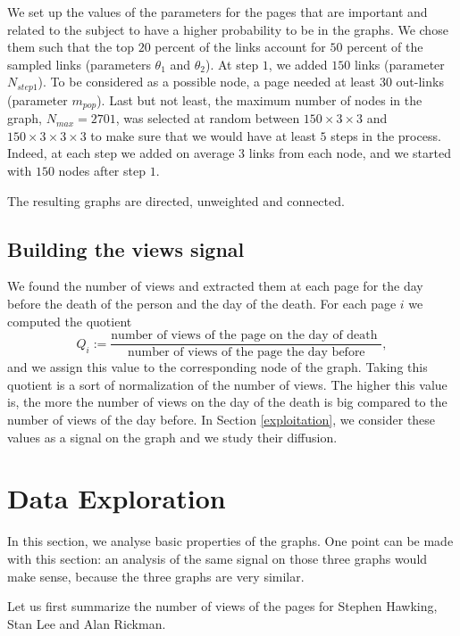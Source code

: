 \documentclass[conference]{IEEEtran}
\begin{document}
We set up the values of the parameters for the pages that are important and related to the subject to have a higher probability to be in the graphs. We chose them such that the top $20$ percent of the links account for $50$ percent of the sampled links (parameters $\theta_1$ and $\theta_2$). At step $1$, we added $150$ links (parameter $N_{step1}$). To be considered as a possible node, a page needed at least $30$ out-links (parameter $m_{pop}$). Last but not least, the maximum number of nodes in the graph, $N_{max}=2701$, was selected at random between $150 \times 3 \times 3$ and $150 \times 3 \times 3 \times 3$ to make sure that we would have at least $5$ steps in the process. Indeed, at each step we added on average $3$ links from each node, and we started with $150$ nodes after step $1$.


\medskip

The resulting graphs are directed, unweighted and connected. 

\subsection{Building the views signal}
We found the number of views and extracted them at each page for the day before the death of the person and the day of the death. 
For each page $i$  we computed the quotient  \[Q_i:=\frac{\text{number of views of the page on the day of death }}{\text{number of views of the page the day before}},\] and we assign this value to the corresponding node of the graph. Taking this quotient is a sort of normalization of the number of views. The higher this value is, the more the number of views on the day of the death is big compared to the number of views of the day before.  In Section \ref{exploitation}, we consider these values as a signal on the graph and we study their diffusion. 

\section{Data Exploration} \label{exploration}

In this section, we analyse basic properties of the graphs.  One point can be made with this section: an analysis of the same signal on those three graphs would make sense, because the three graphs are very similar. 

\medskip

Let us first summarize the number of views of the pages for Stephen Hawking, Stan Lee and Alan Rickman. 
\end{document}
